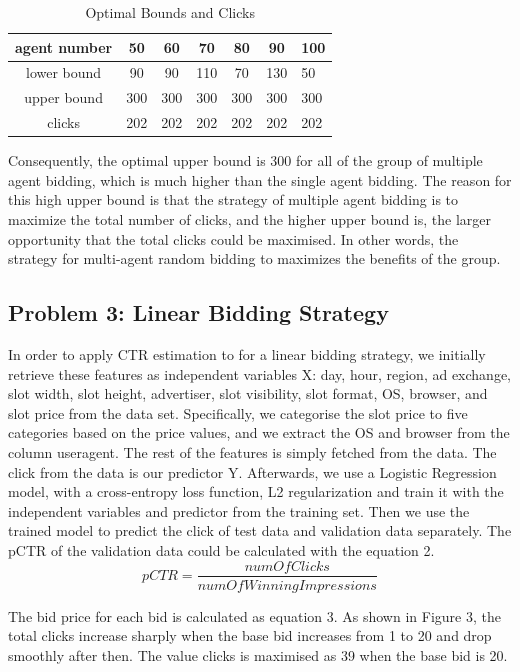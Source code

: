 \documentclass{sig-alternate-05-2015}
\begin{document}
\begin{table}
\centering
\caption{Optimal Bounds and Clicks}
\begin{tabular}{|c|c|c|c|c|c|l|} \hline
agent number&50&60&70&80&90&100\\ \hline
lower bound&90&90&110&70&130&50\\ \hline
upper bound&300&300&300&300&300&300\\ \hline
clicks&202& 202&202&202&202&202\\
\hline\end{tabular}
\end{table}

Consequently, the optimal upper bound is 300 for all of the group of multiple agent bidding, which is much higher than the single agent bidding. The reason for this high upper bound is that the strategy of multiple agent bidding is to maximize the total number of clicks, and the higher upper bound is, the larger opportunity that the total clicks could be maximised. In other words, the strategy for multi-agent random bidding to maximizes the benefits of the group.

\subsection{Problem 3: Linear Bidding Strategy}
In order to apply CTR estimation to for a linear bidding strategy, we initially retrieve these features as independent variables X: day, hour, region, ad exchange, slot width, slot height, advertiser, slot visibility, slot format, OS, browser, and slot price from the data set. Specifically, we categorise the slot price to five categories based on the price values, and we extract the OS and browser from the column useragent. The rest of the features is simply fetched from the data. The click from the data is our predictor Y.
Afterwards, we use a Logistic Regression model, with a cross-entropy loss function, L2 regularization and train it with the independent variables and predictor from the training set. Then we use the trained model to predict the click of test data and validation data separately. The pCTR of the validation data could be calculated with the equation 2.
\begin{equation}pCTR=\frac{numOfClicks}{numOfWinningImpressions}\end{equation}

The bid price for each bid is calculated as equation 3. As shown in Figure 3, the total clicks increase sharply when the base bid increases from 1 to 20 and drop smoothly after then. The value clicks is maximised as 39 when the base bid is 20.
\end{document}
